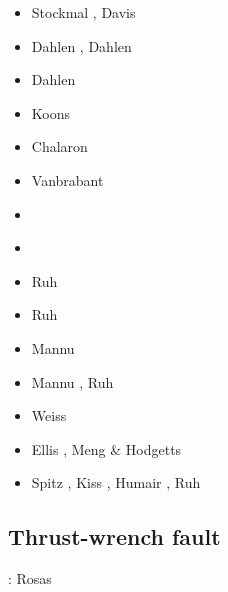 \begin{scriptsize}
\begin{itemize}
\item[\nineteeneightythree] Stockmal \cite{stoc83}, Davis \etal \cite{dasd83}
\item[\nineteeneightyfour] Dahlen \cite{dahl84}, Dahlen \etal \cite{dasd84}
\item[\nineteenninety] Dahlen \cite{dahl90}
\item[\nineteenninetyfour] Koons \cite{koon94}
\item[\nineteenninetyfour] Chalaron \etal \cite{chmm95} 
\item[\nineteenninetynine] Vanbrabant \etal \cite{vajh99}
\item[\twothousandthree] \cite{wiep03}\cite{smbs03}\cite{muso03}\cite{vamf03}
\item[\twothousandsix] \cite{simp06}\cite{yabm06}
\item[\twothousandtwelve] Ruh \etal \cite{rukb12}
\item[\twothousandthirteen] Ruh \etal \cite{rugb13}
\item[\twothousandsixteen] Mannu \etal \cite{mauw16}
\item[\twothousandseventeen] Mannu \etal \cite{mauw17}, Ruh \etal \cite{rugb17}
\item[\twothousandeighteen] Weiss \etal \cite{weib18}
\item[\twothousandnineteen] Ellis \etal \cite{elgb19}, Meng \& Hodgetts \cite{meho19,meho19b}
\item[\twothousandtwenty] Spitz \etal \cite{spsk20,spbe20}, Kiss \etal \cite{kids20}, 
                          Humair \etal \cite{hube20}, Ruh \cite{ruh20}
\end{itemize}
\end{scriptsize}

\subsection{Thrust-wrench fault} 

\begin{scriptsize}
\twothousandfifteen: Rosas \etal \cite{rods15}
\end{scriptsize}

